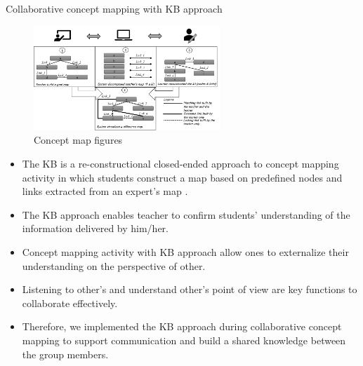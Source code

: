 \begin{frame}[allowframebreaks]{Collaborative concept mapping with KB approach}

    \begin{figure}[tb]
        \begin{center}
            \includegraphics[width=70mm]{images/overview_kb.pdf}
        \end{center}
        \caption{Concept map figures}
        \label{intro::kbmap}
    \end{figure}
    
    \begin{itemize}
        \item The KB is a re-constructional closed-ended approach to concept mapping
        activity in which students construct a map based on predefined nodes and
        links extracted from an expert's map \cite{Hirashima2015,Hirashima2019ReconstructionalReconstruction}. 
        \item The KB approach enables teacher to confirm students' understanding
        of the information delivered by him/her. 
        \item Concept mapping activity with KB approach allow ones to externalize 
        their understanding on the perspective of other.
        \item Listening to other's and understand other's point of view are 
        key functions to collaborate effectively. 
        \item Therefore, we implemented the KB approach during 
        collaborative concept mapping to support communication and 
        build a shared knowledge between the group members.
    \end{itemize}
\end{frame}

